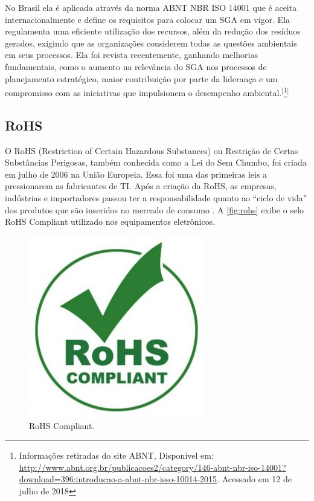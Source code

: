 No Brasil ela é aplicada através da norma ABNT NBR ISO 14001 que é aceita internacionalmente e define os requisitos para colocar um  SGA em vigor. Ela regulamenta uma eficiente utilização dos recursos, além da redução dos resíduos gerados, exigindo que as organizações considerem todas as questões ambientais em seus processos. Ela foi revista recentemente, ganhando melhorias fundamentais, como o aumento na relevância do SGA nos processos de planejamento estratégico, maior contribuição por parte da liderança e um compromisso com as iniciativas que impulsionem o desempenho ambiental.$^{[}$\footnote{Informações retiradas do site ABNT, Disponível em: \url{http://www.abnt.org.br/publicacoes2/category/146-abnt-nbr-iso-14001?download=396:introducao-a-abnt-nbr-isso-10014-2015}.  Acessado em 12 de julho de 2018}$^{]}$
    
\subsection{RoHS}

O RoHS (Restriction of Certain Hazardous Substances) ou Restrição de Certas Substâncias Perigosas, também conhecida como a Lei do Sem Chumbo, foi criada em julho de 2006 na União Europeia. Essa foi uma das primeiras leis a pressionarem as fabricantes de TI. Após a criação da RoHS, as empresas, indústrias e importadores passou ter a responsabilidade quanto ao ``ciclo de vida'' dos produtos que são inseridos no mercado de consumo \cite{garcia2015tecnologia}. A \autoref{fig:rohs} exibe o selo RoHS Compliant utilizado nos equipamentos eletrônicos.

\begin{figure}[htb]
	\caption{\label{fig:rohs}RoHS Compliant.}
	\begin{center}
	    \includegraphics[scale=0.35]{imagens/rohs.jpg}
	\end{center}
\end{figure}

